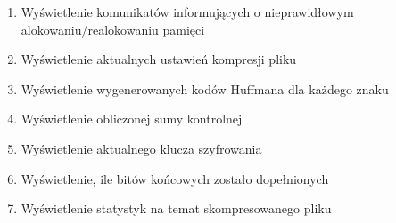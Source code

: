 \documentclass[]{article}
\begin{document}
\begin{enumerate}
\def\labelenumi{\arabic{enumi}.}
\item
Wyświetlenie komunikatów informujących o nieprawidłowym alokowaniu/realokowaniu pamięci
\item
Wyświetlenie aktualnych ustawień kompresji pliku
\item
Wyświetlenie wygenerowanych kodów Huffmana dla każdego znaku
\item
Wyświetlenie obliczonej sumy kontrolnej
\item
Wyświetlenie aktualnego klucza szyfrowania
\item
Wyświetlenie, ile bitów końcowych zostało dopełnionych
\item
Wyświetlenie statystyk na temat skompresowanego pliku

\end{enumerate}
\end{document}
